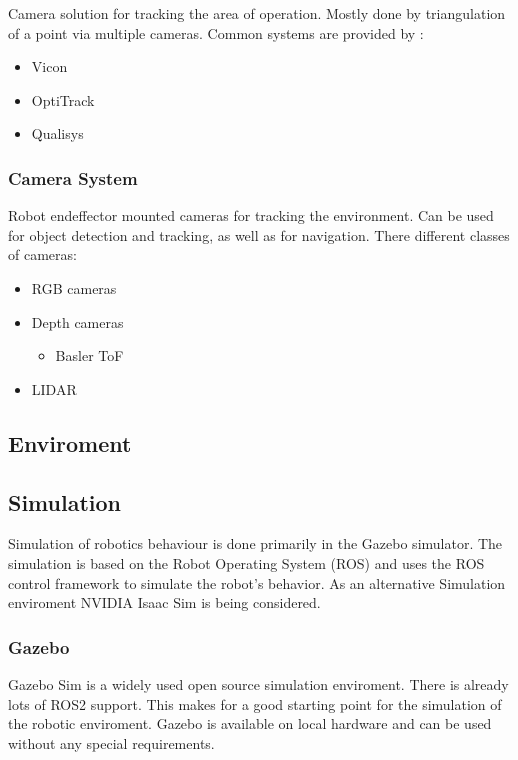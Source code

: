 \documentclass{ltxdockit}
\begin{document}
Camera solution for tracking the area of operation. Mostly done by triangulation of a point via multiple cameras. Common systems are provided by :
\begin{itemize}
  \item Vicon
  \item OptiTrack
  \item Qualisys
\end{itemize}

\subsubsection{Camera System}
\label{sec:robotics:sensor:camera_system}

Robot endeffector mounted cameras for tracking the environment. Can be used for object detection and tracking, as well as for navigation. There different classes of cameras:
\begin{itemize}
  \item RGB cameras
  \item Depth cameras
    \begin{itemize}
      \item Basler ToF
    \end{itemize} 
  \item LIDAR
\end{itemize}

\subsection{Enviroment}
\label{sec:robotics:enviroment}

\subsection{Simulation}
\label{sec:robotics:simulation}
Simulation of robotics behaviour is done primarily in the Gazebo simulator. The simulation is based on the Robot Operating System (ROS) and uses the ROS control framework to simulate the robot's behavior. As an alternative Simulation enviroment NVIDIA Isaac Sim is being considered.

\subsubsection{Gazebo}
\label{sec:robotics:simulation:gazebo}

Gazebo Sim is a widely used open source simulation enviroment. There is already lots of ROS2 support. This makes for a good starting point for the simulation of the robotic enviroment. Gazebo is available on local hardware and can be used without any special requirements. 
\end{document}
